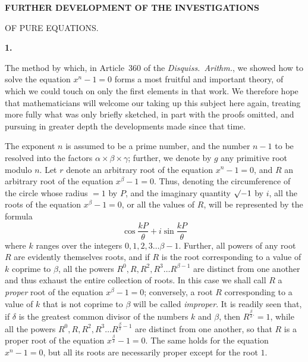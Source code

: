 \clearpage{}
\par\bigskip{}
\begin{center}\large\bfseries FURTHER DEVELOPMENT OF THE INVESTIGATIONS\par\medskip OF PURE EQUATIONS.\end{center}
\renewcommand{\BookRunningTitle}{Further Investigations of Pure Equations}
\renewcommand{\Article}[1]{\par\medskip\Needspace{4\baselineskip}\pdfbookmark[1]{Art. #1}{purae-art-#1}\centerline{\textbf{#1.}}\nobreak\smallskip}

\Article{1}
The method by which, in Article~360 of the \emph{Disquiss.\ Arithm.}, we showed how to solve the equation \mbox{$x^n-1=0$} forms a most fruitful and important theory, of which we could touch on only the first elements in that work. We therefore hope that mathematicians will welcome our taking up this subject here again, treating more fully what was only briefly sketched, in part with the proofs omitted, and pursuing in greater depth the developments made since that time.

The exponent $n$ is assumed to be a prime number, and the number $n-1$ to be resolved into the factors $\alpha\times\beta\times\gamma$; further, we denote by $g$ any primitive root modulo $n$. Let $r$ denote an arbitrary root of the equation \mbox{$x^n-1=0$}, and $R$ an arbitrary root of the equation \mbox{$x^\beta-1=0$}. Thus, denoting the circumference of the circle whose radius $=1$ by $P$, and the imaginary quantity $\mathord{\surd}{-1}$ by $i$, all the roots of the equation \mbox{$x^\beta-1=0$}, or all the values of $R$, will be represented by the formula
\[
\cos\frac{kP}{\theta}+i\sin\frac{kP}{\theta}
\]
where $k$ ranges over the integers $0,1,2,3\ldots\beta-1$. Further, all powers of any root $R$ are evidently themselves roots, and if $R$ is the root corresponding to a value of $k$ coprime to $\beta$, all the powers $R^0,R,R^2,R^3\ldots R^{\beta-1}$ are distinct from one another and thus exhaust the entire collection of roots. In this case we shall call $R$ a \emph{proper} root of the equation \mbox{$x^\beta-1=0$}; conversely, a root $R$
corresponding to a value of $k$ that is not coprime to $\beta$ will be called \emph{improper}. It is readily seen that, if $\delta$ is the greatest common divisor of the numbers $k$ and $\beta$, then $R^{\frac\beta\delta .}=1$, while all the powers $R^0,R,R^2,R^3\ldots R^{\frac\beta\delta-1}$ are distinct from one another, so that $R$ is a proper root of the equation $x^{\frac\beta\delta}-1=0$. The same holds for the equation \mbox{$x^n-1=0$}, but all its roots are necessarily proper except for the root $1$.

